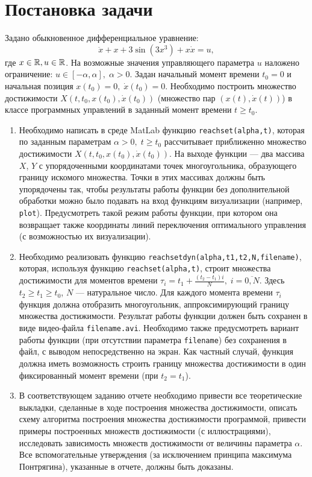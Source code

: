 \section{Постановка задачи}
Задано обыкновенное дифференциальное уравнение:
\begin{equation} \label{eq:main_equation}
        \ddot x + x + 3 \sin(3x^3) + x \dot x = u,
\end{equation}
где $x \in \mathbb{R}, u \in \mathbb{R}$. На возможные значения управляющего параметра $u$ наложено ограничение: $u \in [-\alpha, \alpha],\; \alpha > 0$. Задан начальный момент времени $t_0 = 0$ и начальная позиция $x(t_0) = 0,\; \dot x(t_0) = 0$. Необходимо построить множество достижимости $X(t, t_0, x(t_0), \dot x(t_0))$ (множество пар $(x(t), \dot x(t))$) в классе программных управлений в заданный момент времени $t \geqslant t_0$.
\begin{enumerate}
        \item Необходимо написать в среде MatLab функцию \texttt{reachset(alpha,t)}, которая по заданным параметрам $\alpha > 0,\; t \geqslant t_0$ рассчитывает приближенно множество достижимости $X(t, t_0, x(t_0), \dot x(t_0))$. На выходе функции --- два массива $X$, $Y$ с упорядоченными координатами точек многоугольника, образующего границу искомого множества. Точки в этих массивах должны быть упорядочены так, чтобы результаты работы функции без дополнительной обработки можно было подавать на вход функциям визуализации (например, \texttt{plot}). Предусмотреть такой режим работы функции, при котором она возвращает также координаты линий переключения оптимального управления (с возможностью их визуализации).
        \item Необходимо реализовать функцию \texttt{reachsetdyn(alpha,t1,t2,N,filename)}, которая, используя функцию \texttt{reachset(alpha,t)}, строит множества достижимости для моментов времени $\tau_i = t_1 + \frac{(t_2 - t_1)i}{N},\; i=\overline{0,N}$. Здесь $t_2 \geqslant t_1 \geqslant t_0$, $N$ --- натуральное число. Для каждого момента времени $\tau_i$ функция должна отобразить многоугольник, аппроксимирующий границу множества достижимости. Результат работы функции должен быть сохранен в виде видео-файла \texttt{filename.avi}. Необходимо также предусмотреть вариант работы функции (при отсутствии параметра \texttt{filename}) без сохранения в файл, с выводом непосредственно на экран. Как частный случай, функция должна иметь возможность строить границу множества достижимости в один фиксированный момент времени (при $t_2 = t_1$).
        \item В соответствующем заданию отчете необходимо привести все теоретические выкладки, сделанные в ходе построения множества достижимости, описать схему алгоритма построения множества достижимости программой, привести примеры построенных множеств достижимости (с иллюстрациями), исследовать зависимость множеств достижимости от величины параметра $\alpha$. Все вспомогательные утверждения (за исключением принципа максимума Понтрягина), указанные в отчете, должны быть доказаны.
\end{enumerate}